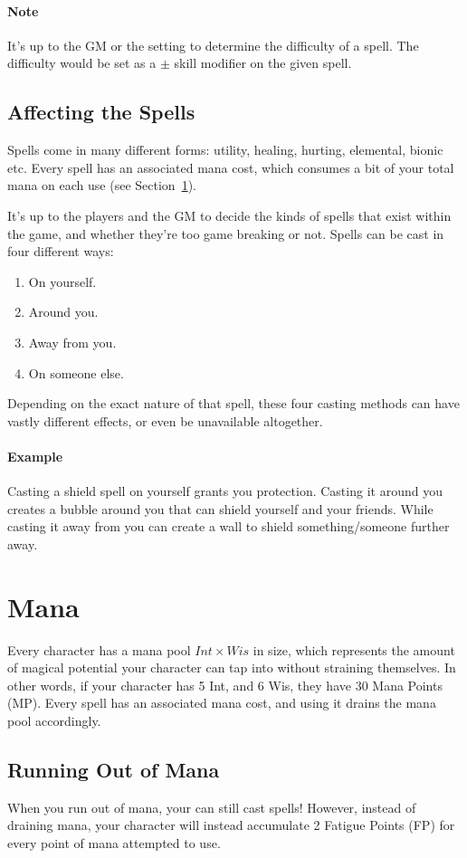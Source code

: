 \paragraph{Note} It's up to the GM or the setting to determine the difficulty of a spell.
The difficulty would be set as a $\pm$ skill modifier on the given spell.

\subsection{Affecting the Spells}
Spells come in many different forms: utility, healing, hurting, elemental, bionic etc.
Every spell has an associated mana cost, which consumes a bit of your total mana on each use (see Section~\ref{sec:mana}).

It's up to the players and the GM to decide the kinds of spells that exist within the game, and whether they're too game breaking or not.
Spells can be cast in four different ways:
\begin{enumerate}
  \item On yourself.
  \item Around you.
  \item Away from you.
  \item On someone else.
\end{enumerate}
Depending on the exact nature of that spell, these four casting methods can have vastly different effects, or even be unavailable altogether.

\paragraph{Example} Casting a shield spell on yourself grants you protection.
Casting it around you creates a bubble around you that can shield yourself and your friends.
While casting it away from you can create a wall to shield something/someone further away.

\section{Mana}\label{sec:mana}
Every character has a mana pool $Int \times Wis$ in size, which represents the amount of magical potential your character can tap into without straining themselves.
In other words, if your character has 5 Int, and 6 Wis, they have 30 Mana Points (MP).
Every spell has an associated mana cost, and using it drains the mana pool accordingly.

\subsection{Running Out of Mana}
When you run out of mana, your can still cast spells!
However, instead of draining mana, your character will instead accumulate 2 Fatigue Points (FP) for every point of mana attempted to use.

